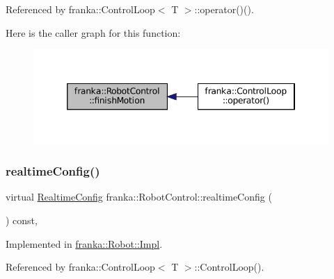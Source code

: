 Referenced by franka\+::\+Control\+Loop$<$ T $>$\+::operator()().

Here is the caller graph for this function\+:
\nopagebreak
\begin{figure}[H]
\begin{center}
\leavevmode
\includegraphics[width=346pt]{classfranka_1_1RobotControl_aae1629178b5eeb5d8e4d41d2f746f2fc_icgraph}
\end{center}
\end{figure}
\mbox{\label{classfranka_1_1RobotControl_aca02c0c27b863d4a42e08d541c400832}} 
\subsubsection{\texorpdfstring{realtime\+Config()}{realtimeConfig()}}
{\footnotesize\ttfamily virtual \hyperlink{namespacefranka_aeede4f4629390fea21ca5e5a35a8a943}{Realtime\+Config} franka\+::\+Robot\+Control\+::realtime\+Config (\begin{DoxyParamCaption}{ }\end{DoxyParamCaption}) const\hspace{0.3cm}{\ttfamily [pure virtual]}, {\ttfamily [noexcept]}}



Implemented in \hyperlink{classfranka_1_1Robot_1_1Impl_a60b2747318e7c957834c62e83c204fbc}{franka\+::\+Robot\+::\+Impl}.



Referenced by franka\+::\+Control\+Loop$<$ T $>$\+::\+Control\+Loop().

